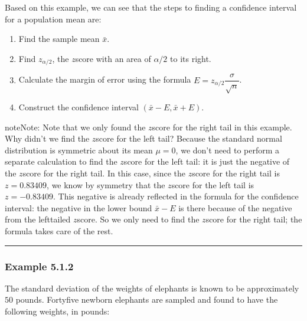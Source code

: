 \documentclass[letterpaper,10pt,english]{jupyterBook}
\begin{document}
\sphinxAtStartPar
Based on this example, we can see that the steps to finding a confidence interval for a population mean are:
\begin{enumerate}
%
\item {} 
\sphinxAtStartPar
Find the sample mean \(\bar{x}\).

\item {} 
\sphinxAtStartPar
Find \(z_{\alpha/2}\), the \(z\)\sphinxhyphen{}score with an area of \(\alpha/2\) to its right.

\item {} 
\sphinxAtStartPar
Calculate the margin of error using the formula \(E = z_{\alpha/2}\dfrac{\sigma}{\sqrt{n}}\).

\item {} 
\sphinxAtStartPar
Construct the confidence interval \((\bar{x} - E, \bar{x} + E)\).

\end{enumerate}

\begin{sphinxadmonition}{note}{Note:}
\sphinxAtStartPar
Note that we only found the \(z\)\sphinxhyphen{}score for the right tail in this example. Why didn’t we find the \(z\)\sphinxhyphen{}score for the left tail? Because the standard normal distribution is symmetric about its mean \(\mu = 0\), we don’t need to perform a separate calculation to find the \(z\)\sphinxhyphen{}score for the left tail: it is just the negative of the \(z\)\sphinxhyphen{}score for the right tail. In this case, since the \(z\)\sphinxhyphen{}score for the right tail is \(z = 0.83409\), we know by symmetry that the \(z\)\sphinxhyphen{}score for the left tail is \(z = -0.83409\). This negative is already reflected in the formula for the confidence interval: the negative in the lower bound \(\bar{x} - E\) is there because of the negative from the left\sphinxhyphen{}tailed \(z\)\sphinxhyphen{}score. So we only need to find the \(z\)\sphinxhyphen{}score for the right tail; the formula takes care of the rest.
\end{sphinxadmonition}


\bigskip\hrule\bigskip



\subsubsection{Example 5.1.2}
\label{\detokenize{Ch5 Confidence Intervals/5.1 Estimating Population Means (Sigma Known):example-5-1-2}}
\sphinxAtStartPar
The standard deviation of the weights of elephants is known to be approximately \(50\) pounds. Forty\sphinxhyphen{}five newborn elephants are sampled and found to have the following weights, in pounds:
\end{document}
